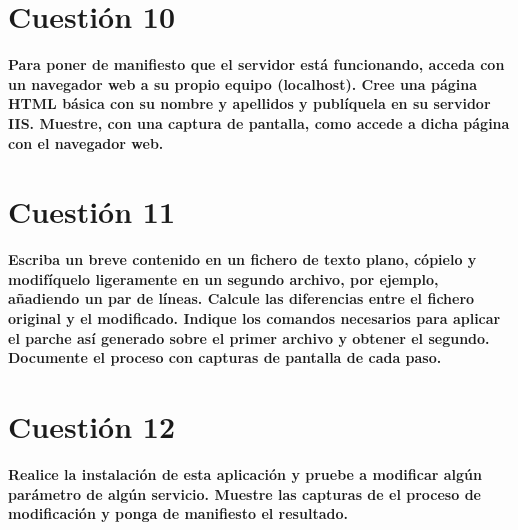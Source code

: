 \documentclass[a4paper,11pt]{article}
\newenvironment{answer}{%
\begin{list}{}{%
}%
\item[]}{\end{list}}
\begin{document}
\section{Cuestión 10}
\textbf{Para poner de manifiesto que el servidor está funcionando, acceda con un navegador web a su propio equipo 
(localhost). Cree una página HTML básica con su nombre y apellidos y publíquela en su servidor IIS. Muestre, con una 
captura de pantalla, como accede a dicha página con el navegador web.}
\begin{answer}
  
\end{answer}

\section{Cuestión 11}
\textbf{Escriba un breve contenido en un fichero de texto plano, cópielo y modifíquelo ligeramente en un segundo archivo, 
por ejemplo, añadiendo un par de líneas. Calcule las diferencias entre el fichero original y el modificado. Indique los
comandos necesarios para aplicar el parche así generado sobre el primer archivo y obtener el segundo. Documente el proceso 
con capturas de pantalla de cada paso.}
\begin{answer}
  
\end{answer}

\section{Cuestión 12}
\textbf{Realice la instalación de esta aplicación y pruebe a modificar algún parámetro de algún servicio. Muestre las 
capturas de el proceso de modificación y ponga de manifiesto el resultado.}
\begin{answer}
  
\end{answer}

\printbibliography
\end{document}
